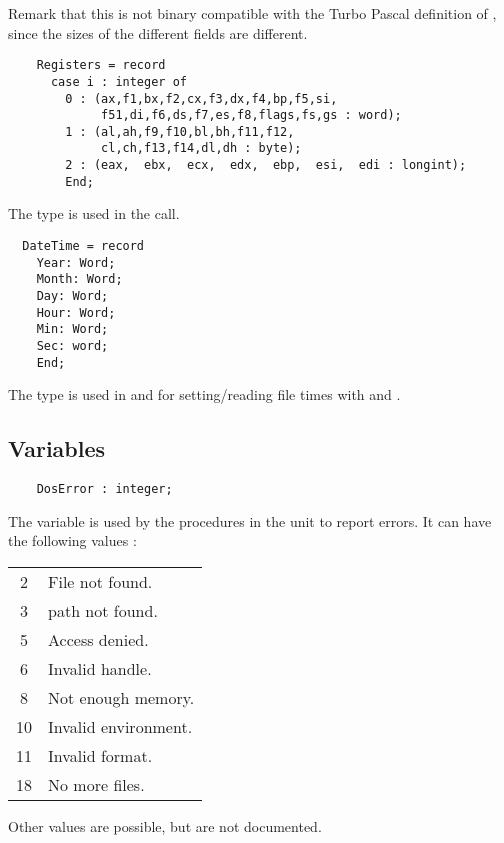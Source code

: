 Remark that this is not binary compatible with the Turbo Pascal definition
of , since the sizes of the different fields are different.
\begin{verbatim}
    Registers = record
      case i : integer of
        0 : (ax,f1,bx,f2,cx,f3,dx,f4,bp,f5,si,
             f51,di,f6,ds,f7,es,f8,flags,fs,gs : word);
        1 : (al,ah,f9,f10,bl,bh,f11,f12,
             cl,ch,f13,f14,dl,dh : byte);
        2 : (eax,  ebx,  ecx,  edx,  ebp,  esi,  edi : longint);
        End;
\end{verbatim}
The   type is used in the  call.
\begin{verbatim}
  DateTime = record
    Year: Word;
    Month: Word;
    Day: Word;
    Hour: Word;
    Min: Word;
    Sec: word;
    End;
\end{verbatim}
The  type is used in  and  for
setting/reading file times with  and .
\subsection{Variables}
\begin{verbatim}
    DosError : integer;
\end{verbatim}
The  variable is used by the procedures in the \dos unit to 
report errors. It can have the following values :
\begin{center}
\begin{tabular}{cl}
2 & File not found. \\
3 & path not found. \\
5 & Access denied. \\
6 & Invalid handle. \\
8 & Not enough memory. \\
10 & Invalid environment. \\
11 & Invalid format. \\
18 & No more files.
\end{tabular}
\end{center}
Other values are possible, but are not documented.
